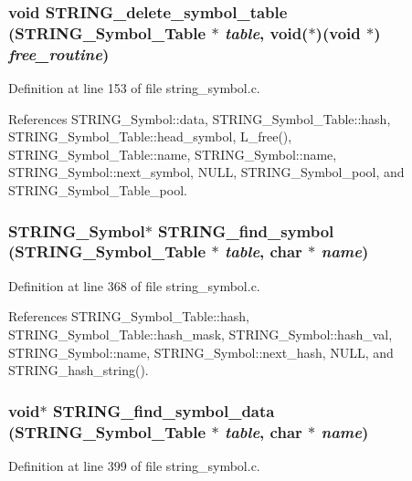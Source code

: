 \subsubsection{\setlength{\rightskip}{0pt plus 5cm}void STRING\_\-delete\_\-symbol\_\-table (\bf{STRING\_\-Symbol\_\-Table} $\ast$ {\em table}, void($\ast$)(void $\ast$) {\em free\_\-routine})}\label{string__symbol_8h_d4fa6d3a295ecc9c21da1cd8d828474e}




Definition at line 153 of file string\_\-symbol.c.

References STRING\_\-Symbol::data, STRING\_\-Symbol\_\-Table::hash, STRING\_\-Symbol\_\-Table::head\_\-symbol, L\_\-free(), STRING\_\-Symbol\_\-Table::name, STRING\_\-Symbol::name, STRING\_\-Symbol::next\_\-symbol, NULL, STRING\_\-Symbol\_\-pool, and STRING\_\-Symbol\_\-Table\_\-pool.
\subsubsection{\setlength{\rightskip}{0pt plus 5cm}\bf{STRING\_\-Symbol}$\ast$ STRING\_\-find\_\-symbol (\bf{STRING\_\-Symbol\_\-Table} $\ast$ {\em table}, char $\ast$ {\em name})}\label{string__symbol_8h_37705fddebdfab067437338d4063abbe}




Definition at line 368 of file string\_\-symbol.c.

References STRING\_\-Symbol\_\-Table::hash, STRING\_\-Symbol\_\-Table::hash\_\-mask, STRING\_\-Symbol::hash\_\-val, STRING\_\-Symbol::name, STRING\_\-Symbol::next\_\-hash, NULL, and STRING\_\-hash\_\-string().
\subsubsection{\setlength{\rightskip}{0pt plus 5cm}void$\ast$ STRING\_\-find\_\-symbol\_\-data (\bf{STRING\_\-Symbol\_\-Table} $\ast$ {\em table}, char $\ast$ {\em name})}\label{string__symbol_8h_da0f492911e7e3f00b09b45442a17637}




Definition at line 399 of file string\_\-symbol.c.

